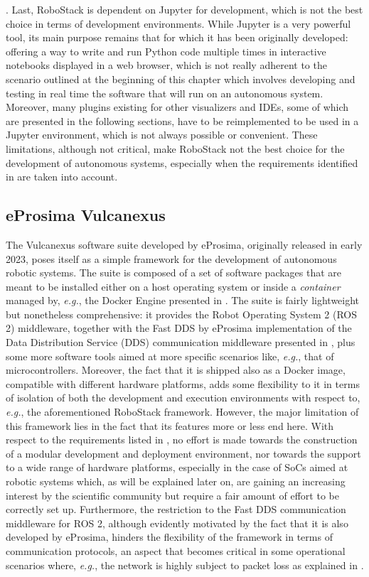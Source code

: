 \cite{fischer_robostack_2022}. Last, RoboStack is dependent on Jupyter for development, which is not the best choice in terms of development environments. While Jupyter is a very powerful tool, its main purpose remains that for which it has been originally developed: offering a way to write and run Python code multiple times in interactive notebooks displayed in a web browser, which is not really adherent to the scenario outlined at the beginning of this chapter which involves developing and testing in real time the software that will run on an autonomous system. Moreover, many plugins existing for other visualizers and IDEs, some of which are presented in the following sections, have to be reimplemented to be used in a Jupyter environment, which is not always possible or convenient. These limitations, although not critical, make RoboStack not the best choice for the development of autonomous systems, especially when the requirements identified in  are taken into account.

\subsection{eProsima Vulcanexus}
\label{sec:related_work_vulcanexus}
The Vulcanexus software suite \cite{eprosima_vulcanexus_nodate} developed by eProsima, originally released in early 2023, poses itself as a simple framework for the development of autonomous robotic systems. The suite is composed of a set of software packages that are meant to be installed either on a host operating system or inside a \emph{container} managed by, \emph{e.g.}, the Docker Engine presented in . The suite is fairly lightweight but nonetheless comprehensive: it provides the Robot Operating System 2 (ROS 2) middleware, together with the Fast DDS by eProsima \cite{eprosima_fast_nodate} implementation of the Data Distribution Service (DDS) communication middleware presented in , plus some more software tools aimed at more specific scenarios like, \emph{e.g.}, that of microcontrollers. Moreover, the fact that it is shipped also as a Docker image, compatible with different hardware platforms, adds some flexibility to it in terms of isolation of both the development and execution environments with respect to, \emph{e.g.}, the aforementioned RoboStack framework. However, the major limitation of this framework lies in the fact that its features more or less end here. With respect to the requirements listed in , no effort is made towards the construction of a modular development and deployment environment, nor towards the support to a wide range of hardware platforms, especially in the case of SoCs aimed at robotic systems which, as will be explained later on, are gaining an increasing interest by the scientific community but require a fair amount of effort to be correctly set up. Furthermore, the restriction to the Fast DDS communication middleware for ROS 2, although evidently motivated by the fact that it is also developed by eProsima, hinders the flexibility of the framework in terms of communication protocols, an aspect that becomes critical in some operational scenarios where, \emph{e.g.}, the network is highly subject to packet loss as explained in .

